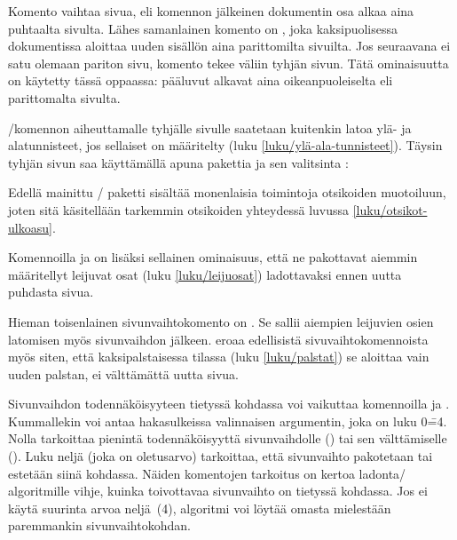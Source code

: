 Komento  vaihtaa sivua, eli komennon jälkeinen
dokumentin osa alkaa aina puhtaalta sivulta. Lähes samanlainen komento
on , joka kaksipuolisessa dokumentissa
aloittaa uuden sisällön aina parittomilta sivuilta. Jos seuraavana ei
satu olemaan pariton sivu, komento tekee väliin tyhjän sivun. Tätä
ominaisuutta on käytetty tässä oppaassa: pääluvut alkavat aina
oikeanpuoleiselta eli parittomalta sivulta.

\-/komennon aiheuttamalle tyhjälle sivulle
saatetaan kuitenkin latoa ylä- ja alatunnisteet, jos sellaiset on
määritelty (luku \ref{luku/ylä-ala-tunnisteet}). Täysin tyhjän sivun saa
käyttämällä apuna pakettia  ja sen valitsinta
:

\begin{koodilohkosis}
\usepackage[clearempty]{titlesec}
\end{koodilohkosis}

\noindent
Edellä mainittu \-/ paketti sisältää monenlaisia
toimintoja otsikoiden muotoiluun, joten sitä käsitellään tarkemmin
otsikoiden yhteydessä luvussa \ref{luku/otsikot-ulkoasu}.

Komennoilla  ja  on lisäksi
sellainen ominaisuus, että ne pakottavat aiemmin määritellyt leijuvat
osat (luku \ref{luku/leijuosat}) ladottavaksi ennen uutta puhdasta
sivua.

Hieman toisenlainen sivunvaihtokomento on . Se sallii
aiempien leijuvien osien latomisen myös sivunvaihdon jälkeen.
 eroaa edellisistä sivuvaihtokomennoista myös siten,
että kaksipalstaisessa tilassa (luku \ref{luku/palstat}) se aloittaa
vain uuden palstan, ei välttämättä uutta sivua.

Sivunvaihdon todennäköisyyteen tietyssä kohdassa voi vaikuttaa
komennoilla  ja . Kummallekin
voi antaa hakasulkeissa valinnaisen argumentin, joka on luku 0\==4.
Nolla tarkoittaa pienintä todennäköisyyttä sivunvaihdolle
() tai sen välttämiselle
(). Luku neljä (joka on oletusarvo)
tarkoittaa, että sivunvaihto pakotetaan tai estetään siinä kohdassa.
Näiden komentojen tarkoitus on kertoa ladonta\-/ algoritmille vihje,
kuinka toivottavaa sivunvaihto on tietyssä kohdassa. Jos ei käytä
suurinta arvoa neljä~(4), algoritmi voi löytää omasta mielestään
paremmankin sivunvaihtokohdan.

